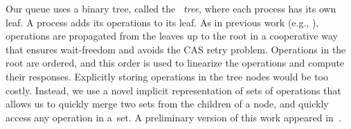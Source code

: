Our queue uses a binary tree, called the \emph{\ordering\ tree}, where each process has its own leaf.
A process adds its operations to its leaf.
As in previous work (e.g., \cite{DBLP:conf/stoc/AfekDT95,DBLP:conf/fsttcs/JayantiP05}), operations are propagated from the leaves up to the root in a cooperative way that ensures wait-freedom
and avoids the CAS retry problem.
Operations in the root are ordered, 
and this order is used to linearize the operations and compute their responses.
Explicitly storing  operations in the tree nodes would be too costly.
Instead, we use a novel implicit representation of sets
of operations that allows us to quickly merge two sets from the children of a node,
and quickly access any  operation in a~set.
A preliminary version of this work appeared in~\cite{Nad22}.
